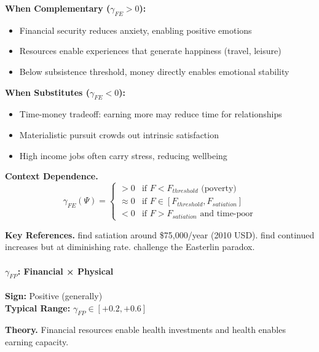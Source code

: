 \textbf{When Complementary ($\gamma_{FE} > 0$):}
\begin{itemize}
    \item Financial security reduces anxiety, enabling positive emotions
    \item Resources enable experiences that generate happiness (travel, leisure)
    \item Below subsistence threshold, money directly enables emotional stability
\end{itemize}

\textbf{When Substitutes ($\gamma_{FE} < 0$):}
\begin{itemize}
    \item Time-money tradeoff: earning more may reduce time for relationships
    \item Materialistic pursuit crowds out intrinsic satisfaction
    \item High income jobs often carry stress, reducing wellbeing
\end{itemize}

\textbf{Context Dependence.}
\begin{equation}
\gamma_{FE}(\Psi) = \begin{cases}
    > 0 & \text{if } F < F_{threshold} \text{ (poverty)} \\
    \approx 0 & \text{if } F \in [F_{threshold}, F_{satiation}] \\
    < 0 & \text{if } F > F_{satiation} \text{ and time-poor}
\end{cases}
\end{equation}

\textbf{Key References.}
\citet{kahneman2010high} find satiation around \$75,000/year (2010 USD).
\citet{killingsworth2021experienced} find continued increases but at 
diminishing rate. \citet{stevenson2008economic} challenge the Easterlin paradox.


\paragraph{$\gamma_{FP}$: Financial × Physical}

\begin{tcolorbox}[colback=green!5, colframe=green!50!black]
\textbf{Sign:} Positive (generally) \\
\textbf{Typical Range:} $\gamma_{FP} \in [+0.2, +0.6]$
\end{tcolorbox}

\textbf{Theory.}
Financial resources enable health investments and health enables earning capacity.

